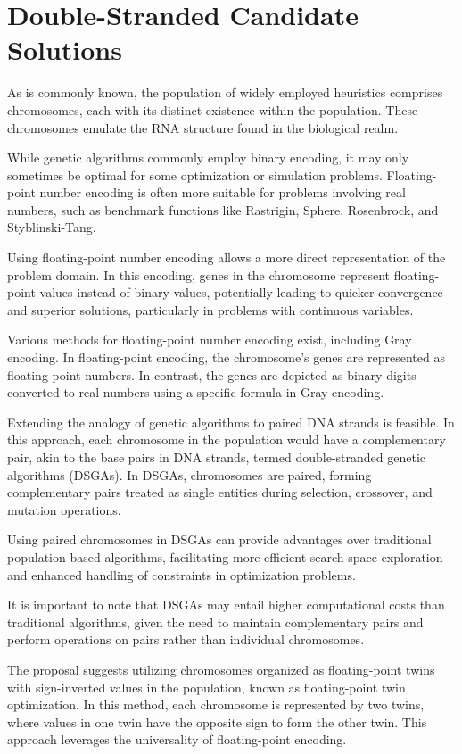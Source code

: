 \documentclass[runningheads]{llncs}
\begin{document}
\section{Double-Stranded Candidate Solutions}

As is commonly known, the population of widely employed heuristics comprises chromosomes, each with its distinct existence within the population. These chromosomes emulate the RNA structure found in the biological realm.

While genetic algorithms commonly employ binary encoding, it may only sometimes be optimal for some optimization or simulation problems. Floating-point number encoding is often more suitable for problems involving real numbers, such as benchmark functions like Rastrigin, Sphere, Rosenbrock, and Styblinski-Tang\cite{Jamil-2013}.

Using floating-point number encoding allows a more direct representation of the problem domain. In this encoding, genes in the chromosome represent floating-point values instead of binary values, potentially leading to quicker convergence and superior solutions, particularly in problems with continuous variables.

Various methods for floating-point number encoding exist, including Gray encoding. In floating-point encoding, the chromosome's genes are represented as floating-point numbers. In contrast, the genes are depicted as binary digits converted to real numbers using a specific formula in Gray encoding.

Extending the analogy of genetic algorithms to paired DNA strands is feasible. In this approach, each chromosome in the population would have a complementary pair, akin to the base pairs in DNA strands, termed double-stranded genetic algorithms (DSGAs)\cite{Zang-2019}. In DSGAs, chromosomes are paired, forming complementary pairs treated as single entities during selection, crossover, and mutation operations.

Using paired chromosomes in DSGAs can provide advantages over traditional population-based algorithms, facilitating more efficient search space exploration and enhanced handling of constraints in optimization problems.

It is important to note that DSGAs may entail higher computational costs than traditional algorithms, given the need to maintain complementary pairs and perform operations on pairs rather than individual chromosomes.

The proposal suggests utilizing chromosomes organized as floating-point twins with sign-inverted values in the population, known as floating-point twin optimization. In this method, each chromosome is represented by two twins\cite{Yang-2003}, where values in one twin have the opposite sign to form the other twin. This approach leverages the universality of floating-point encoding.
\end{document}
